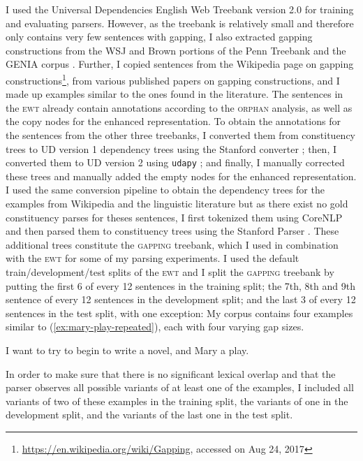 \documentclass[lucida,biblatex]{sp} %
\begin{document}
I used the Universal Dependencies English Web Treebank version 2.0 \citep[henceforth \textsc{ewt};][]{Silveira2014,Nivre2017a,Nivre2017b} for training and evaluating parsers. However, as the treebank is relatively small and therefore only contains very few sentences with gapping, I also extracted gapping constructions from the WSJ and Brown portions of the Penn Treebank \citep{Marcus1993} and the GENIA corpus \citep{Ohta2002}. Further, I copied sentences from the Wikipedia page on gapping constructions\footnote{\url{https://en.wikipedia.org/wiki/Gapping}, accessed on Aug 24, 2017}, from various published papers on gapping constructions, and I made up examples similar to the ones found in the literature. The sentences in the \textsc{ewt} already contain annotations according to the \textsc{orphan} analysis, as well as the copy nodes for the enhanced representation. To obtain the annotations for the sentences from the other three treebanks, I converted them from constituency trees to UD version 1 dependency trees using the Stanford converter \citep{Schuster2016}; then, I converted them to UD version 2 using \texttt{udapy} \citep{Popel2017}; and finally, I manually corrected these trees and manually added the empty nodes for the enhanced representation. I used the same conversion pipeline to obtain the dependency trees for the examples from Wikipedia and the linguistic literature but as there exist no gold constituency parses for theses sentences, I first tokenized them using CoreNLP \citep{Manning2014} and then parsed them to constituency trees using the Stanford Parser \citep{Klein2003}. These additional trees constitute the \textsc{gapping} treebank, which I used in combination with the \textsc{ewt} for some of my parsing experiments. I used the default train/development/test splits of the \textsc{ewt} and I split the \textsc{gapping} treebank by putting the first 6 of every 12 sentences in the training split; the 7th, 8th and 9th sentence of every 12 sentences in the development split; and the last 3 of every 12 sentences in the test split, with one exception: My corpus contains four examples similar to (\ref{ex:mary-play-repeated}), each with four varying gap sizes. 
\begin{exe}
\ex \label{ex:mary-play-repeated} I want to try to begin to write a novel, and Mary a play. \\
\null \hfill \citep{Ross1970}
\end{exe}
In order to make sure that there is no significant lexical overlap and that the parser observes all possible variants of at least one of the examples, I included all variants of two of these examples in the training split, the variants of one in the development split, and the variants of the last one in the test split.
\end{document}
